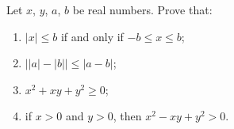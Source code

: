 Let $x$, $y$, $a$, $b$ be real numbers. Prove that:
\begin{enumerate}
\item[(i)] $|x|\le b$ if and only if $-b\le x\le b$;
\item[(ii)] $\big||a|-|b|\big|\le|a-b|$;
\item[(iii)] $x^2+xy+y^2\ge0$;
\item[(iv)] if $x>0$ and $y>0$, then $x^2-xy+y^2>0$.
\end{enumerate}
